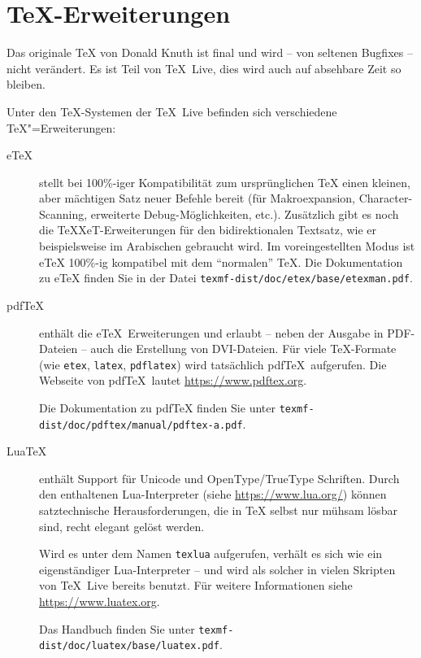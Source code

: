 \documentclass[12pt,ngerman,a4paper,fullparskip]{report}
\newcommand{\TL}{\TeX\ Live\xspace}
\newcommand{\prog}[1]{\texttt{#1}}
\newcommand{\OnCD}[1]{\texttt{#1}}
\newcommand{\filename}[1]{\texttt{#1}}
\newcommand{\TeXXeT}{TeXXeT}
\providecommand*{\eTeX}{e\TeX\xspace}
\begin{document}
\section{\TeX-Erweiterungen}\label{sec:tex-extensions}

Das originale \TeX{} von Donald Knuth ist final und wird -- von seltenen Bugfixes -- nicht verändert. Es ist Teil von \TL{}, dies wird auch auf absehbare Zeit so bleiben.

Unter den \TeX-Systemen der {\TL} befinden sich verschiedene \TeX"=Erweiterungen:

\begin{description}
\item [\eTeX]\label{text:etex} stellt bei 100\%-iger Kompatibilität zum
      ursprünglichen {\TeX} einen kleinen, aber mächtigen Satz neuer Befehle
      bereit (für Makroexpansion, Character-Scanning, erweiterte Debug-Möglichkeiten, etc.).
      Zusätzlich gibt es noch die \TeXXeT-Erweiterungen für den bidirektionalen Textsatz, 
      wie er beispielsweise im Arabischen gebraucht wird.
      Im voreingestellten Modus ist {\eTeX} 100\%-ig kompatibel mit dem \enquote{normalen} \TeX.
      Die Dokumentation zu {\eTeX} finden Sie in der Datei
      \OnCD{texmf-dist/doc/etex/base/etex\textunderscore man.pdf}.
\item [pdf\TeX] enthält die \eTeX\ Erweiterungen und erlaubt -- neben der Ausgabe in PDF-Dateien -- auch die Erstellung von DVI-Dateien.  Für viele \TeX-Formate (wie \prog{etex}, \prog{latex}, \prog{pdflatex}) wird tatsächlich pdf\TeX\ aufgerufen. Die Webseite von pdf\TeX\ lautet \url{https://www.pdftex.org}.
      
Die Dokumentation zu pdf\TeX{} finden Sie unter  \newline \OnCD{texmf-dist/doc/pdftex/manual/pdftex-a.pdf}. 

\item [Lua\TeX] enthält Support für Unicode und OpenType/TrueType Schriften. Durch den enthaltenen Lua-Interpreter (siehe \url{https://www.lua.org/}) können satztechnische Herausforderungen, die in \TeX{} selbst nur mühsam lösbar sind, recht elegant gelöst werden.

Wird es unter dem Namen \filename{texlua} aufgerufen, verhält es sich wie ein eigenständiger Lua-Interpreter -- und wird als solcher in vielen Skripten von \TL bereits benutzt. Für weitere Informationen siehe \url{https://www.luatex.org}.

Das Handbuch finden Sie unter \OnCD{texmf-dist/doc/luatex/base/luatex.pdf}.


\end{description}
\end{document}
